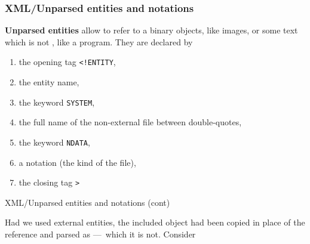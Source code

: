 %
\begin{frame}[containsverbatim]
\frametitle{XML/Unparsed entities and notations}

\textbf{Unparsed entities} allow to refer to a binary objects, like
images, or some text which is not \XML, like a program. They are
declared by
\begin{enumerate}

  \item the opening tag \verb|<!ENTITY|,

  \item the entity name,

  \item the keyword \verb|SYSTEM|,

  \item the full name of the non-\XML external file between
    double-quotes,

  \item the keyword \verb|NDATA|,

  \item a notation (the kind of the file),

  \item the closing tag \verb|>|

\end{enumerate}

\end{frame}

%
\begin{frame}{XML/Unparsed entities and notations (cont)}

Had we used external entities, the included object had been copied in
place of the reference and parsed as \XML{} ---~which it is
not. Consider

\end{frame}

